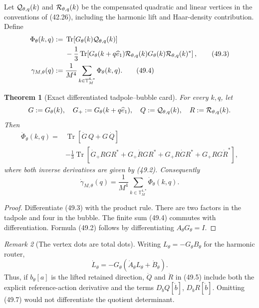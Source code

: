 \documentclass[11pt,oneside]{book}
\newtheorem{theorem}{Theorem}[chapter]
\theoremstyle{definition}
\theoremstyle{remark}
\newtheorem{remark}[theorem]{Remark}
\newcommand{\Tr}{\operatorname{Tr}}
\begin{document}
Let \({\cal Q}_{\theta,q}(k)\) and
\({\cal R}_{\theta,q}(k)\) be the compensated quadratic and linear
vertices in the conventions of (42.26), including the harmonic
lift and Haar-density contribution.  Define
\[
\begin{split}
 \Phi_\theta(k,q):={}&
 \Tr\!\left[G_\theta(k){\cal Q}_{\theta,q}(k)\right]\\
 &-\frac13\Tr\!\left[
 G_\theta(k+q\widehat e_1){\cal R}_{\theta,q}(k)
 G_\theta(k){\cal R}_{\theta,q}(k)^*\right],                 \tag{49.3}\\
 \gamma_{M,\theta}(q):={}&
 \frac1{M^4}\sum_{k\in{\mathbb T}_M^{4,*}}\Phi_\theta(k,q).
                                                                    \tag{49.4}
\end{split}
\]

\begin{theorem}[Exact differentiated tadpole--bubble card]
\label{thm:e8v49-differentiated-card}
For every \(k,q\), let
\[
 G:=G_\theta(k),\quad G_+:=G_\theta(k+q\widehat e_1),\quad
 Q:={\cal Q}_{\theta,q}(k),\quad
 R:={\cal R}_{\theta,q}(k).
\]
Then
\[
\boxed{\begin{split}
 \dot\Phi_\theta(k,q)
 ={}&\Tr[\dot G\,Q+G\,\dot Q]\\
 &-\frac13\Tr[
 \dot G_+RGR^*
 +G_+\dot RGR^*
 +G_+R\dot G R^*
 +G_+RG\dot R^*],
\end{split}}                                                  \tag{49.5}
\]
where both inverse derivatives are given by (49.2).  Consequently
\[
 \boxed{\dot\gamma_{M,\theta}(q)
 =\frac1{M^4}\sum_{k\in{\mathbb T}_M^{4,*}}
 \dot\Phi_\theta(k,q).}                                      \tag{49.6}
\]
\end{theorem}

\begin{proof}
Differentiate (49.3) with the product rule.  There are two factors
in the tadpole and four in the bubble.  The finite sum (49.4)
commutes with differentiation.  Formula (49.2) follows by
differentiating \(A_\theta G_\theta=I\).
\end{proof}

\begin{remark}[The vertex dots are total dots]
\label{rem:e8v49-total-dots}
Writing \(L_\theta=-G_\theta B_\theta\) for the harmonic router,
\[
 \dot L_\theta
 =-G_\theta(\dot A_\theta L_\theta+\dot B_\theta).            \tag{49.7}
\]
Thus, if \(b_\theta[a]\) is the lifted retained direction,
\(\dot Q\) and \(\dot R\) in (49.5) include both the explicit
reference-action derivative and the terms
\(D_bQ[\dot b]\), \(D_bR[\dot b]\).  Omitting (49.7) would not
differentiate the quotient determinant.
\end{remark}
\end{document}

